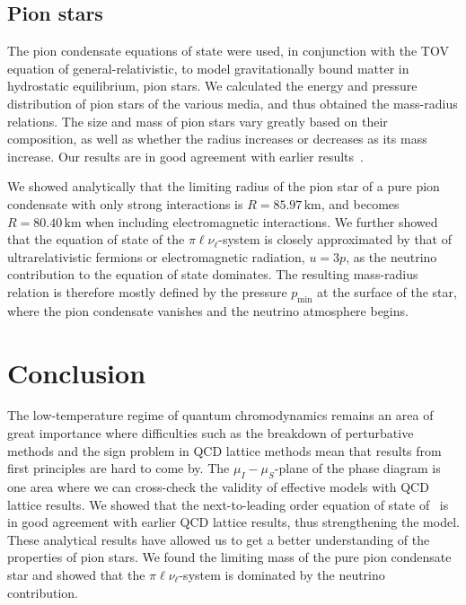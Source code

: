\subsection{Pion stars}

The pion condensate equations of state were used, in conjunction with the TOV equation of general-relativistic, to model gravitationally bound matter in hydrostatic equilibrium, pion stars.
We calculated the energy and pressure distribution of pion stars of the various media, and thus obtained the mass-radius relations.
The size and mass of pion stars vary greatly based on their composition, as well as whether the radius increases or decreases as its mass increase.
Our results are in good agreement with earlier results~\autocite{andersenBoseEinsteinCondensationPion2018,brandtNewClassCompact2018}.

We showed analytically that the limiting radius of the pion star of a pure pion condensate with only strong interactions is $R = 85.97\,\text{km}$, and becomes $R = 80.40\,\text{km}$ when including electromagnetic interactions.
We further showed that the equation of state of the $\pi\ell\nu_\ell$-system is closely approximated by that of ultrarelativistic fermions or electromagnetic radiation, $u = 3p$, as the neutrino contribution to the equation of state dominates.
The resulting mass-radius relation is therefore mostly defined by the pressure $p_\text{min}$ at the surface of the star, where the pion condensate vanishes and the neutrino atmosphere begins.



\section{Conclusion}

The low-temperature regime of quantum chromodynamics remains an area of great importance where difficulties such as the breakdown of perturbative methods and the sign problem in QCD lattice methods mean that results from first principles are hard to come by.
The $\mu_I-\mu_S$-plane of the phase diagram is one area where we can cross-check the validity of effective models with QCD lattice results.
We showed that the next-to-leading order equation of state of \chpt\, is in good agreement with earlier QCD lattice results, thus strengthening the model.
These analytical results have allowed us to get a better understanding of the properties of pion stars.
We found the limiting mass of the pure pion condensate star and showed that the $\pi\ell\nu_\ell$-system is dominated by the neutrino contribution.



